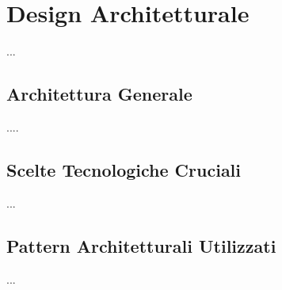 

\chapter{Design Architetturale}
    ...
    \section{Architettura Generale}
    ....
    
    \section{Scelte Tecnologiche Cruciali}
    ...
    \section{Pattern Architetturali Utilizzati}
    ...